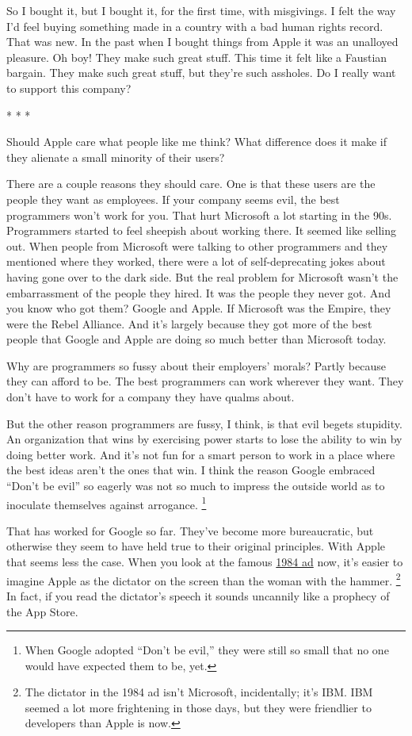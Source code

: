 So I bought it, but I bought it, for the first time, with misgivings. I
felt the way I'd feel buying something made in a country with a bad
human rights record. That was new. In the past when I bought things from
Apple it was an unalloyed pleasure. Oh boy! They make such great stuff.
This time it felt like a Faustian bargain. They make such great stuff,
but they're such assholes. Do I really want to support this company?

* * *

Should Apple care what people like me think? What difference does it
make if they alienate a small minority of their users?

There are a couple reasons they should care. One is that these users are
the people they want as employees. If your company seems evil, the best
programmers won't work for you. That hurt Microsoft a lot starting in
the 90s. Programmers started to feel sheepish about working there. It
seemed like selling out. When people from Microsoft were talking to
other programmers and they mentioned where they worked, there were a lot
of self-deprecating jokes about having gone over to the dark side. But
the real problem for Microsoft wasn't the embarrassment of the people
they hired. It was the people they never got. And you know who got them?
Google and Apple. If Microsoft was the Empire, they were the Rebel
Alliance. And it's largely because they got more of the best people that
Google and Apple are doing so much better than Microsoft today.

Why are programmers so fussy about their employers' morals? Partly
because they can afford to be. The best programmers can work wherever
they want. They don't have to work for a company they have qualms about.

But the other reason programmers are fussy, I think, is that evil begets
stupidity. An organization that wins by exercising power starts to lose
the ability to win by doing better work. And it's not fun for a smart
person to work in a place where the best ideas aren't the ones that win.
I think the reason Google embraced ``Don't be evil'' so eagerly was not
so much to impress the outside world as to inoculate themselves against
arrogance. \footnote{When Google adopted ``Don't be evil,'' they were still so small
that no one would have expected them to be, yet.}

That has worked for Google so far. They've become more bureaucratic, but
otherwise they seem to have held true to their original principles. With
Apple that seems less the case. When you look at the famous
\href{http://www.uriahcarpenter.info/1984.html}{1984 ad} now, it's
easier to imagine Apple as the dictator on the screen than the woman
with the hammer. \footnote{The dictator in the 1984 ad isn't Microsoft, incidentally; it's
IBM. IBM seemed a lot more frightening in those days, but they were
friendlier to developers than Apple is now.} In fact, if you read the
dictator's speech it sounds uncannily like a prophecy of the App Store.

